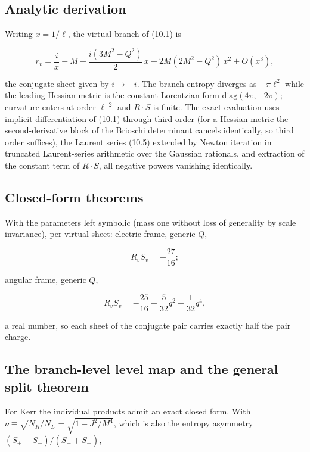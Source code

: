 \documentclass[11pt]{article}
\begin{document}
\subsection{Analytic derivation}

Writing $x = 1/\ell$, the virtual branch of (10.1) is

\begin{equation*}
r_v = \frac{i}{x} - M + \frac{i(3M^2 - Q^2)}{2}\,x + 2M(2M^2 - Q^2)\,x^2 + O(x^3), \tag{10.5}
\end{equation*}

the conjugate sheet given by $i \to -i$. The branch entropy diverges as $-\pi\ell^2$ while the leading Hessian metric is the constant Lorentzian form $\mathrm{diag}(4\pi, -2\pi)$; curvature enters at order $\ell^{-2}$ and $R\cdot S$ is finite. The exact evaluation uses implicit differentiation of (10.1) through third order (for a Hessian metric the second-derivative block of the Brioschi determinant cancels identically, so third order suffices), the Laurent series (10.5) extended by Newton iteration in truncated Laurent-series arithmetic over the Gaussian rationals, and extraction of the constant term of $R\cdot S$, all negative powers vanishing identically.

\subsection{Closed-form theorems}

With the parameters left symbolic (mass one without loss of generality by scale invariance), per virtual sheet: electric frame, generic $Q$,

\begin{equation*}
R_v S_v = -\frac{27}{16}; \tag{10.6}
\end{equation*}

angular frame, generic $Q$,

\begin{equation*}
R_v S_v = -\frac{25}{16} + \frac{5}{32}q^2 + \frac{1}{32}q^4, \tag{10.7}
\end{equation*}

a real number, so each sheet of the conjugate pair carries exactly half the pair charge.

\subsection{The branch-level level map and the general split theorem}

For Kerr the individual products admit an exact closed form. With $\nu \equiv \sqrt{N_R/N_L} = \sqrt{1 - J^2/M^4}$, which is also the entropy asymmetry $(S_+ - S_-)/(S_+ + S_-)$,
\end{document}
